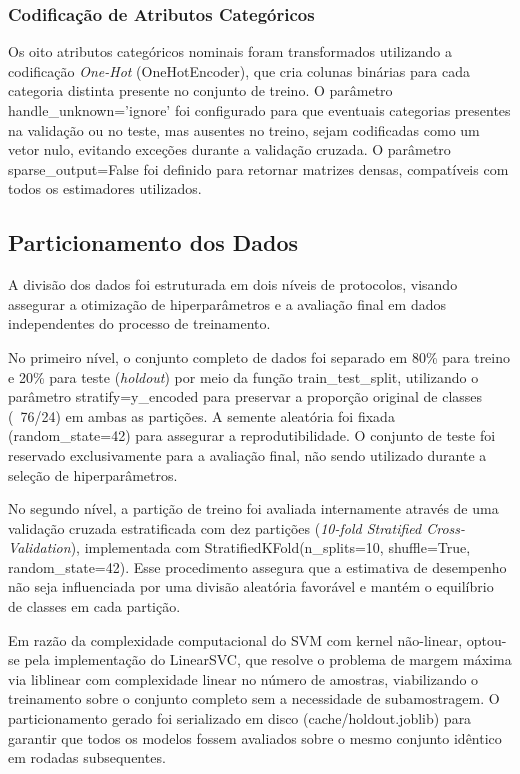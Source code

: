 \subsubsection{Codificação de Atributos Categóricos}
Os oito atributos categóricos nominais foram transformados utilizando a codificação \textit{One-Hot} (OneHotEncoder), que cria colunas binárias para cada categoria distinta presente no conjunto de treino. O parâmetro handle\_unknown='ignore' foi configurado para que eventuais categorias presentes na validação ou no teste, mas ausentes no treino, sejam codificadas como um vetor nulo, evitando exceções durante a validação cruzada. O parâmetro sparse\_output=False foi definido para retornar matrizes densas, compatíveis com todos os estimadores utilizados.

\subsection{Particionamento dos Dados}
A divisão dos dados foi estruturada em dois níveis de protocolos, visando assegurar a otimização de hiperparâmetros e a avaliação final em dados independentes do processo de treinamento.

No primeiro nível, o conjunto completo de dados foi separado em 80\% para treino e 20\% para teste (\textit{holdout}) por meio da função train\_test\_split, utilizando o parâmetro stratify=y\_encoded para preservar a proporção original de classes (~76/24) em ambas as partições. A semente aleatória foi fixada (random\_state=42) para assegurar a reprodutibilidade. O conjunto de teste foi reservado exclusivamente para a avaliação final, não sendo utilizado durante a seleção de hiperparâmetros.

No segundo nível, a partição de treino foi avaliada internamente através de uma validação cruzada estratificada com dez partições (\textit{10-fold Stratified Cross-Validation}), implementada com StratifiedKFold(n\_splits=10, shuffle=True, random\_state=42). Esse procedimento assegura que a estimativa de desempenho não seja influenciada por uma divisão aleatória favorável e mantém o equilíbrio de classes em cada partição.

Em razão da complexidade computacional do SVM com kernel não-linear, optou-se pela implementação do LinearSVC, que resolve o problema de margem máxima via liblinear com complexidade linear no número de amostras, viabilizando o treinamento sobre o conjunto completo sem a necessidade de subamostragem. O particionamento gerado foi serializado em disco (cache/holdout.joblib) para garantir que todos os modelos fossem avaliados sobre o mesmo conjunto idêntico em rodadas subsequentes.

